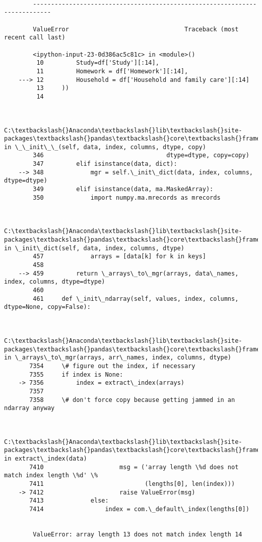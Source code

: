 \documentclass[11pt]{article}
\begin{document}
    \begin{Verbatim}[commandchars=\\\{\}]

        ---------------------------------------------------------------------------

        ValueError                                Traceback (most recent call last)

        <ipython-input-23-0d386ac5c81c> in <module>()
         10         Study=df['Study'][:14],
         11         Homework = df['Homework'][:14],
    ---> 12         Household = df['Household and family care'][:14]
         13     ))
         14 
    

        C:\textbackslash{}Anaconda\textbackslash{}lib\textbackslash{}site-packages\textbackslash{}pandas\textbackslash{}core\textbackslash{}frame.pyc in \_\_init\_\_(self, data, index, columns, dtype, copy)
        346                                  dtype=dtype, copy=copy)
        347         elif isinstance(data, dict):
    --> 348             mgr = self.\_init\_dict(data, index, columns, dtype=dtype)
        349         elif isinstance(data, ma.MaskedArray):
        350             import numpy.ma.mrecords as mrecords
    

        C:\textbackslash{}Anaconda\textbackslash{}lib\textbackslash{}site-packages\textbackslash{}pandas\textbackslash{}core\textbackslash{}frame.pyc in \_init\_dict(self, data, index, columns, dtype)
        457             arrays = [data[k] for k in keys]
        458 
    --> 459         return \_arrays\_to\_mgr(arrays, data\_names, index, columns, dtype=dtype)
        460 
        461     def \_init\_ndarray(self, values, index, columns, dtype=None, copy=False):
    

        C:\textbackslash{}Anaconda\textbackslash{}lib\textbackslash{}site-packages\textbackslash{}pandas\textbackslash{}core\textbackslash{}frame.pyc in \_arrays\_to\_mgr(arrays, arr\_names, index, columns, dtype)
       7354     \# figure out the index, if necessary
       7355     if index is None:
    -> 7356         index = extract\_index(arrays)
       7357 
       7358     \# don't force copy because getting jammed in an ndarray anyway
    

        C:\textbackslash{}Anaconda\textbackslash{}lib\textbackslash{}site-packages\textbackslash{}pandas\textbackslash{}core\textbackslash{}frame.pyc in extract\_index(data)
       7410                     msg = ('array length \%d does not match index length \%d' \%
       7411                            (lengths[0], len(index)))
    -> 7412                     raise ValueError(msg)
       7413             else:
       7414                 index = com.\_default\_index(lengths[0])
    

        ValueError: array length 13 does not match index length 14

    \end{Verbatim}
\end{document}
